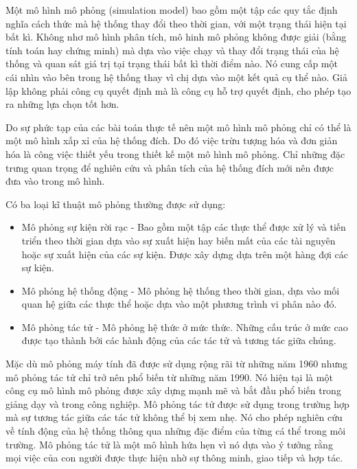 \documentclass[../report.tex]{subfiles}
\begin{document}
Một mô hình mô phỏng (simulation model) bao gồm một tập các quy tắc định nghĩa cách thức 
mà hệ thống thay đổi theo thời gian, với một trạng thái hiện tại bất kì.
\cite{multi-agent-simulation}
Không nhơ mô hình phân tích, mô hinh mô phỏng không được giải (bằng tính toán hay chứng minh) mà dựa vào 
việc chạy và thay đổi trạng thái của hệ thống và quan sát giá trị tại trạng thái bất kì thời điểm nào. Nó cung cấp 
một cái nhìn vào bên trong hệ thống thay vì chị dựa vào một kết quả cụ thể nào. 
Giả lập không phải công cụ quyết định mà là công cụ hỗ trợ quyết định, cho phép tạo ra những lựa chọn tốt hơn. 

Do sự phức tạp của các bài toán thực tế nên một mô hình mô phỏng chỉ có thể là một mô hình xấp xỉ của hệ thống đích. 
Do đó việc trừu tượng hóa và đơn giản hóa là công việc thiết yếu trong thiết kế một mô hình mô phỏng. Chỉ những đặc trưng 
quan trọng để nghiên cứu và phân tích của hệ thống đích mới nên được đưa vào trong mô hình. 

Có ba loại kĩ thuật mô phỏng thường được sử dụng: 
\begin{itemize}
\item Mô phỏng sự kiện rời rạc - Bao gồm một tập các thực thể được xử lý và tiến triển theo thời gian dựa vào 
sự xuất hiện hay biến mất của các tài nguyên hoặc sự xuất hiện của các sự kiện. Được xây dựng dựa trên 
một hàng đợi các sự kiện. 
\item Mô phỏng hệ thống động - Mô phỏng hệ thống theo thời gian, dựa vào mối quan hệ giữa các thực thể hoặc dựa 
vào một phương trình vi phân nào đó. 
\item Mô phỏng tác tử - Mô phỏng hệ thức ở mức thức. Những cấu trúc ở mức cao được tạo thành bởi các hành động của các 
tác tử và tương tác giữa chúng. 
\end{itemize}

Mặc dù mô phỏng máy tính đã được sử dụng rộng rãi từ những năm 1960 nhưng mô phỏng tác tử chỉ trở nên phổ biến từ những
năm 1990. Nó hiện tại là một công cụ mô hình mô phỏng được xây dựng mạnh mẽ và bắt đầu phổ biến trong giảng dạy và trong 
công nghiệp. Mô phỏng tác tử được sử dụng trong trường hợp mà sự tương tác giữa các tác tử không thể bị xem nhẹ. Nó 
cho phép nghiên cứu về tính động của hệ thống thông qua những đặc điểm của từng cá thể trong môi trường. 
Mô phỏng tác tử là một mô hình hứa hẹn vì nó dựa vào ý tưởng rằng mọi việc của con người được thực hiện nhờ sự thông minh, 
giao tiếp và hợp tác. 
\end{document}
